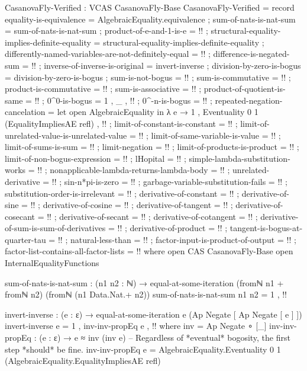 \documentclass{report}
\begin{document}
\begin{code}
CasanovaFly-Verified : VCAS CasanovaFly-Base
CasanovaFly-Verified = record
  { equality-is-equivalence = AlgebraicEquality.equivalence
  ; sum-of-nats-is-nat-sum = sum-of-nats-is-nat-sum
  ; product-of-e-and-1-is-e = {!!}
  ; structural-equality-implies-definite-equality =
    structural-equality-implies-definite-equality
  ; differently-named-variables-are-not-definitely-equal = {!!}
  ; difference-is-negated-sum = {!!}
  ; inverse-of-inverse-is-original = invert-inverse
  ; division-by-zero-is-bogus = division-by-zero-is-bogus
  ; sum-is-not-bogus = {!!}
  ; sum-is-commutative = {!!}
  ; product-is-commutative = {!!}
  ; sum-is-associative = {!!}
  ; product-of-quotient-is-same = {!!}
  ; 0^0-is-bogus = 1 , _ , {!!}
  ; 0^-n-is-bogus = {!!}
  ; repeated-negation-cancelation =
    let open AlgebraicEquality in
    λ e → 1
        , Eventuality 0 1 (EqualityImpliesAE refl)
        , {!!}
  ; limit-of-constant-is-constant = {!!}
  ; limit-of-unrelated-value-is-unrelated-value = {!!}
  ; limit-of-same-variable-is-value = {!!}
  ; limit-of-sums-is-sum = {!!}
  ; limit-negation = {!!}
  ; limit-of-products-is-product = {!!}
  ; limit-of-non-bogus-expression = {!!}
  ; lHopital = {!!}
  ; simple-lambda-substitution-works = {!!}
  ; nonapplicable-lambda-returns-lambda-body = {!!}
  ; unrelated-derivative = {!!}
  ; sin-n*pi-is-zero = {!!}
  ; garbage-variable-substitution-fails = {!!}
  ; substitution-order-is-irrelevant = {!!}
  ; derivative-of-constant = {!!}
  ; derivative-of-sine = {!!}
  ; derivative-of-cosine = {!!}
  ; derivative-of-tangent = {!!}
  ; derivative-of-cosecant = {!!}
  ; derivative-of-secant = {!!}
  ; derivative-of-cotangent = {!!}
  ; derivative-of-sum-is-sum-of-derivatives = {!!}
  ; derivative-of-product = {!!}
  ; tangent-is-bogus-at-quarter-tau = {!!}
  ; natural-less-than = {!!}
  ; factor-input-is-product-of-output = {!!}
  ; factor-list-contains-all-factor-lists = {!!}
  }
  where
  open CAS CasanovaFly-Base
  open InternalEqualityFunctions

  sum-of-nats-is-nat-sum :
    (n1 n2 : ℕ) →
    equal-at-some-iteration (fromℕ n1 + fromℕ n2) (fromℕ (n1 Data.Nat.+ n2))
  sum-of-nats-is-nat-sum n1 n2 = 1 , {!!}

  invert-inverse : (e : ε) → equal-at-some-iteration e (Ap Negate [ Ap Negate [ e ] ])
  invert-inverse e = 1 , inv-inv-propEq e , {!!}
    where
    inv = Ap Negate ∘ [_]
    inv-inv-propEq :
      (e : ε) →
      e ≈ inv (inv e)
    -- Regardless of *eventual* bogosity, the first step *should* be fine.
    inv-inv-propEq e =
      AlgebraicEquality.Eventuality 0 1 (AlgebraicEquality.EqualityImpliesAE refl)


\end{code}
\end{document}
